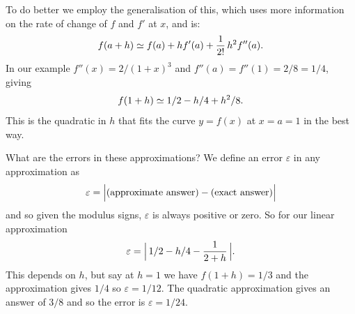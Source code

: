 To do better we employ the generalisation of this, which uses more information on the rate of change of $f$ and $f'$ at $x$, and is:
%
\begin{equation}
f(a+h)  \simeq f(a) + h f'(a) + \frac{1}{2!} \, h^2 f''(a) .
\notag
\end{equation}
%
In our example $f''(x) = {2}/{(1+x)^3}$ and $f''(a) = f''(1) = 2/8 = 1/4$, giving
\begin{equation}
f(1+h)  \simeq  1/2  - h / 4  + h^2/8 .
\notag
\end{equation}
%
This is the quadratic in $h$ that fits the curve $y=f(x)$ at $x=a=1$ in the best way.

What are the errors in these approximations? We define an error $\varepsilon$ in any approximation as
%
\begin{equation}
\varepsilon = \Big| \text{(approximate answer)} - \text{(exact answer)}   \Big|
\notag
\end{equation}
%
and so given the modulus signs, $\varepsilon$ is always positive or zero. %
So for our linear approximation 
%
\begin{equation}
\varepsilon = \Big| \, 1/2  - h / 4    -  \frac{1}{2+h} \,\Big|.
\notag
\end{equation}
%
This depends on $h$, but say at $h=1$ we have $f(1+h) = 1/3$ and the approximation gives $1/4$ so $\varepsilon = 1/12$. The quadratic 
approximation gives an answer of $3/8$ and so the error is $\varepsilon = 1/24$. 



